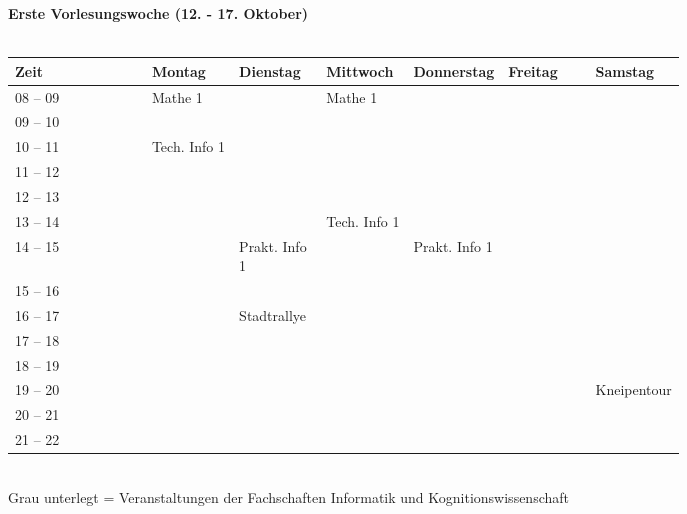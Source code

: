\textbf{Erste Vorlesungswoche (12. - 17. Oktober)}\\
\\
\begin{tabular}{|l|p{0.13\linewidth}|p{0.13\linewidth}|p{0.13\linewidth}|p{0.13\linewidth}|p{0.13\linewidth}|p{0.13\linewidth}|} \hline
Zeit & Montag & Dienstag & Mittwoch & Donnerstag & Freitag & Samstag \\ 
\hline \hline \cline{3-3}
08 -- 09 & \footnotesize{Mathe 1} & & \footnotesize{Mathe 1} & & &\\ \cline{1-1}
09 -- 10 &  & & & & &  \\ \cline{1-1} \cline{2-2} \cline{4-4}
10 -- 11 & \footnotesize{Tech. Info 1} & & & & & \\ \cline{1-1}
11 -- 12 & & & & & & \\ \cline{1-1} \cline{2-2}
12 -- 13 & & & & & & \\ \cline{1-1} \cline{4-4}
13 -- 14 & & & \footnotesize{Tech. Info 1}  & & & \\ \cline{1-1} \cline{3-3} \cline{4-4} \cline{5-5}
14 -- 15 & &\footnotesize{Prakt. Info 1} & &\footnotesize{Prakt. Info 1} & & \\ \cline{1-1}
15 -- 16 & & & & & & \\ \cline {1-1} \cline{3-3} \cline{5-5}
16 -- 17 & &\cellcolor{lightlightgray} \footnotesize{Stadtrallye} & & & & \\ \cline{1-1}
17 -- 18 & &\cellcolor{lightlightgray} & & & & \\ \cline{1-1}
18 -- 19 & &\cellcolor{lightlightgray} & & & &  \\ \cline{1-1}
19 -- 20 & &\cellcolor{lightlightgray} & & & & \cellcolor{lightlightgray} \footnotesize{Kneipentour} \\ \cline{1-1}
20 -- 21 & & & & & &\cellcolor{lightlightgray}\\ \cline{1-1}
21 -- 22 & & & & & &\cellcolor{lightlightgray}\\ \hline
\end{tabular}
\\
 {\scriptsize Grau unterlegt = Veranstaltungen der Fachschaften Informatik und Kognitionswissenschaft }


